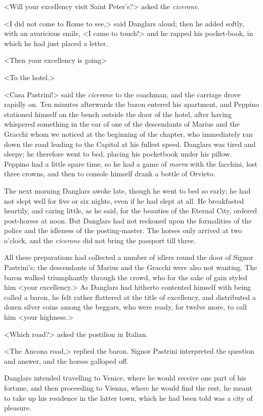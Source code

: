  <Will your excellency visit Saint Peter's?> asked the \textit{cicerone}. 

 <I did not come to Rome to see,> said Danglars aloud; then he added softly, with an avaricious smile, <I came to touch!> and he rapped his pocket-book, in which he had just placed a letter. 

 <Then your excellency is going\longdash> 

 <To the hotel.> 

 <Casa Pastrini!> said the \textit{cicerone} to the coachman, and the carriage drove rapidly on.  Ten minutes afterwards the baron entered his apartment, and Peppino stationed himself on the bench outside the door of the hotel, after having whispered something in the ear of one of the descendants of Marius and the Gracchi whom we noticed at the beginning of the chapter, who immediately ran down the road leading to the Capitol at his fullest speed. Danglars was tired and sleepy; he therefore went to bed, placing his pocketbook under his pillow. Peppino had a little spare time, so he had a game of \textit{morra} with the facchini, lost three crowns, and then to console himself drank a bottle of Orvieto. 

 The next morning Danglars awoke late, though he went to bed so early; he had not slept well for five or six nights, even if he had slept at all. He breakfasted heartily, and caring little, as he said, for the beauties of the Eternal City, ordered post-horses at noon. But Danglars had not reckoned upon the formalities of the police and the idleness of the posting-master. The horses only arrived at two o'clock, and the \textit{cicerone} did not bring the passport till three. 

 All these preparations had collected a number of idlers round the door of Signor Pastrini's; the descendants of Marius and the Gracchi were also not wanting. The baron walked triumphantly through the crowd, who for the sake of gain styled him <your excellency.> As Danglars had hitherto contented himself with being called a baron, he felt rather flattered at the title of excellency, and distributed a dozen silver coins among the beggars, who were ready, for twelve more, to call him <your highness.> 

 <Which road?> asked the postilion in Italian. 

 <The Ancona road,> replied the baron. Signor Pastrini interpreted the question and answer, and the horses galloped off. 

 Danglars intended travelling to Venice, where he would receive one part of his fortune, and then proceeding to Vienna, where he would find the rest, he meant to take up his residence in the latter town, which he had been told was a city of pleasure. 

